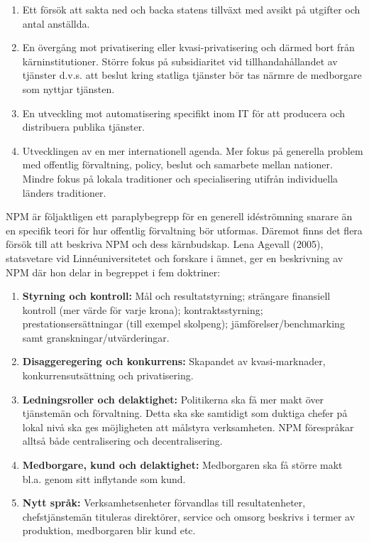 \begin{enumerate}
  \item Ett försök att sakta ned och backa statens tillväxt med avsikt på utgifter och antal anställda.
  \item En övergång mot privatisering eller kvasi-privatisering och därmed bort från kärninstitutioner. Större fokus på subsidiaritet vid tillhandahållandet av tjänster d.v.s. att beslut kring statliga tjänster bör tas närmre de medborgare som nyttjar tjänsten.
  \item En utveckling mot automatisering specifikt inom IT för att producera och distribuera publika tjänster.
  \item Utvecklingen av en mer internationell agenda. Mer fokus på generella problem med offentlig förvaltning, policy, beslut och samarbete mellan nationer. Mindre fokus på lokala traditioner och specialisering utifrån individuella länders traditioner.
\end{enumerate}

NPM är följaktligen ett paraplybegrepp för en generell idéströmning snarare än
en specifik teori för hur offentlig förvaltning bör utformas. Däremot finns det
flera försök till att beskriva NPM och dess kärnbudskap. Lena Agevall (2005),
statsvetare vid Linnéuniversitetet och forskare i ämnet, ger en beskrivning av
NPM där hon delar in begreppet i fem doktriner:

\begin{enumerate}
  \item \textbf{Styrning och kontroll:} Mål och resultatstyrning; strängare
  finansiell kontroll (mer värde för varje krona); kontraktsstyrning;
  prestationsersättningar (till exempel skolpeng); jämförelser/benchmarking samt
  granskningar/utvärderingar.
  \item \textbf{Disaggeregering och konkurrens:} Skapandet av kvasi-marknader, konkurrensutsättning och privatisering.
  \item \textbf{Ledningsroller och delaktighet:} Politikerna ska få mer makt över tjänstemän och förvaltning. Detta ska ske samtidigt som duktiga chefer på lokal nivå ska ges möjligheten att målstyra verksamheten. NPM förespråkar alltså både centralisering och decentralisering.
  \item \textbf{Medborgare, kund och delaktighet:} Medborgaren ska få större makt bl.a. genom sitt inflytande som kund.
  \item \textbf{Nytt språk:} Verksamhetsenheter förvandlas till resultatenheter, chefstjänstemän tituleras direktörer, service och omsorg beskrivs i termer av produktion, medborgaren blir kund etc.
\end{enumerate}


